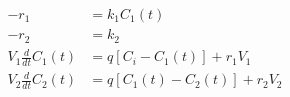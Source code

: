 \begin{equation}
  \begin{aligned}
    - r_1                  & = k_1 C_1(t)
    \\
    - r_2                  & = k_2
    \label{eq:two_stirred_tank02_2}
    \\
    V_1 \frac{d}{dt}C_1(t) & = q [C_i - C_1(t)] + r_1 V_1
    \\
    V_2 \frac{d}{dt}C_2(t) & = q [C_1(t) - C_2(t)] + r_2 V_2
  \end{aligned}
\end{equation}